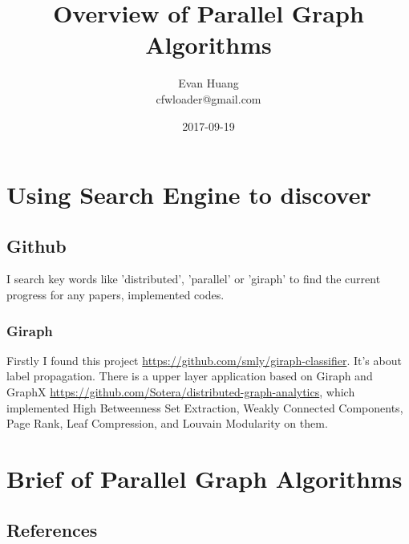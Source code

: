 \documentclass{article}
\title{Overview of Parallel Graph Algorithms}
\date{2017-09-19}
\author{Evan Huang \\ cfwloader@gmail.com}
\begin{document}


	\tableofcontents


	\newpage

	\section{Using Search Engine to discover}
	\subsection{Github}
	I search key words like 'distributed', 'parallel' or 'giraph' to find the current progress for any papers, implemented codes.
	\subsubsection{Giraph}
	Firstly I found this project \url{https://github.com/smly/giraph-classifier}. It's about label propagation.
	There is a upper layer application based on Giraph and GraphX \url{https://github.com/Sotera/distributed-graph-analytics}, which implemented High Betweenness Set Extraction, Weakly Connected Components, Page Rank, Leaf Compression, and Louvain Modularity on them.

	\section{Brief of Parallel Graph Algorithms}

	\begin{appendix}
		\section{References}
	\end{appendix}
\end{document}
